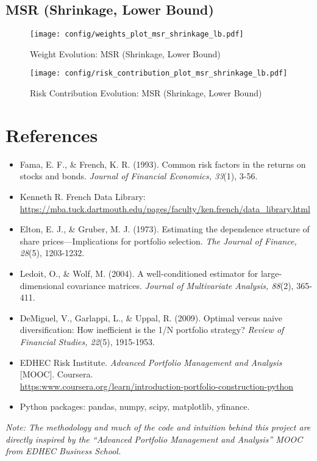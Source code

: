\documentclass{article}
\begin{document}
\subsection{MSR (Shrinkage, Lower Bound)}
\begin{figure}[H]
    \centering
    \texttt{[image: config/weights\_plot\_msr\_shrinkage\_lb.pdf]}
    \caption{Weight Evolution: MSR (Shrinkage, Lower Bound)}
    \label{fig:weights_msr_shrinkage_lb}
\end{figure}
\begin{figure}[H]
    \centering
    \texttt{[image: config/risk\_contribution\_plot\_msr\_shrinkage\_lb.pdf]}
    \caption{Risk Contribution Evolution: MSR (Shrinkage, Lower Bound)}
    \label{fig:risk_contribution_msr_shrinkage_lb}
\end{figure}
\clearpage


\section*{References}

\begin{itemize}
    \item Fama, E. F., \& French, K. R. (1993). Common risk factors in the returns on stocks and bonds. \textit{Journal of Financial Economics, 33}(1), 3-56.
    \item Kenneth R. French Data Library: \\ \url{https://mba.tuck.dartmouth.edu/pages/faculty/ken.french/data_library.html}
    \item Elton, E. J., \& Gruber, M. J. (1973). Estimating the dependence structure of share prices—Implications for portfolio selection. \textit{The Journal of Finance, 28}(5), 1203-1232.
    \item Ledoit, O., \& Wolf, M. (2004). A well-conditioned estimator for large-dimensional covariance matrices. \textit{Journal of Multivariate Analysis, 88}(2), 365-411.
    \item DeMiguel, V., Garlappi, L., \& Uppal, R. (2009). Optimal versus naive diversification: How inefficient is the 1/N portfolio strategy? \textit{Review of Financial Studies, 22}(5), 1915-1953.
    \item {EDHEC Risk Institute.} \textit{Advanced Portfolio Management and Analysis} [MOOC]. Coursera. \\ \url{https:www.coursera.org/learn/introduction-portfolio-construction-python}
    \item Python packages: pandas, numpy, scipy, matplotlib, yfinance.
\end{itemize}

\noindent
\textit{Note: The methodology and much of the code and intuition behind this project are directly inspired by the ``Advanced Portfolio Management and Analysis'' MOOC from EDHEC Business School.}
\end{document}
